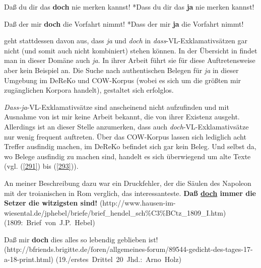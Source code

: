 \begin{exe}
	\ex\label{289} 
		\begin{xlist}	
			\ex\label{289a} Daß du dir das \textbf{doch} nie merken kannst!
			\hfill\hbox {\citet[56]{Thurmair1989}}
			\ex\label{289b} *Dass du dir das \textbf{ja} nie merken kannst!
		\end{xlist}
\end{exe}

\begin{exe}
	\ex\label{290} 
		\begin{xlist}	
			\ex\label{290a} Daß der mir \textbf{doch} die Vorfahrt nimmt!
			\ex\label{290b} *Dass der mir \textbf{ja} die Vorfahrt nimmt!
			\hfill\hbox {\citet[152]{Zaefferer1988}}
		\end{xlist}
\end{exe}
\citet[40-41]{Altmann1987} geht stattdessen davon aus, dass \textit{ja} und \textit{doch} in \textit{dass}-VL-Exklamativsätzen  gar nicht (und somit auch nicht kombiniert) stehen können. In der Übersicht in \citet[59]{Karagjosova2004} findet man in dieser Domäne auch \textit{ja}. In ihrer Arbeit führt sie für diese Auftretensweise aber kein Beispiel an. Die Suche nach authentischen Belegen für \textit{ja} in dieser Umgebung im DeReKo und COW-Korpus (wobei es sich um die größten mir zugänglichen Korpora handelt), gestaltet sich erfolglos.

\textit{Dass-ja}-VL-Exklamativsätze sind anscheinend nicht aufzufinden und mit Ausnahme von \citet{Karagjosova2004} ist mir keine Arbeit bekannt, die von ihrer Existenz ausgeht. Allerdings ist an dieser Stelle anzumerken, dass auch \textit{doch}-VL-Exklamativsätze nur wenig frequent auftreten. Über das COW-Korpus lassen sich lediglich acht Treffer ausfindig machen, im DeReKo befindet sich gar kein Beleg. Und selbst da, wo Belege ausfindig zu machen sind, handelt es sich überwiegend um alte Texte (vgl. (\ref{291}) bis (\ref{293})).
 
\begin{exe}
	\ex\label{291} 
	\scriptsize
		An meiner Beschreibung dazu war ein Druckfehler, der die Säulen des Napoleon mit der troianischen in Rom verglich, das interessanteste. 					\textbf{Daß \underline{doch} immer die Setzer die witzigsten sind!}
			\newline
			\hbox{}\hfill\hbox{(http://www.hausen-im-wiesental.de/jphebel/briefe/brief\_hendel\_sch\%C3\%BCtz\_1809\_I.htm)}
			\newline
			\hbox{}\hfill\hbox{(1809: Brief von J.P. Hebel)}	
\end{exe}
\vspace{-0.65cm}
\begin{exe}
	\ex\label{292} 
	\scriptsize
		Daß mir \textbf{doch} dies alles so lebendig geblieben ist!
			\newline
			\hbox{}\hfill\hbox{(http://bfriends.brigitte.de/foren/allgemeines-forum/89544-gedicht-des-tages-17-a-18-print.html)}
			\newline
			\hbox{}\hfill\hbox{(19./erstes Drittel 20 Jhd.: Arno Holz)}		 
\end{exe}
			   
